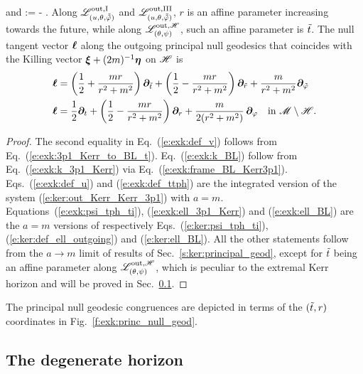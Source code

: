 \begin{greybox}
\begin{itemize}
\ee
and
\be \label{e:exk:psi_tph_ti}
    \psi := \tph -  .
\ee
Along $\mathscr{L}^{\rm out, I}_{(u,\theta,\tilde{{\tilde\varphi}})}$ and $\mathscr{L}^{\rm out, III}_{(u,\theta,\tilde{{\tilde\varphi}})}$,
$r$ is an affine parameter increasing towards the future,
while along $\mathscr{L}^{{\rm out},\mathscr{H}}_{(\theta,\psi)}$, such an affine parameter is ${\tilde t}$. The null tangent vector $\bm{\ell}$ along the outgoing principal null geodesics
that coincides with the Killing vector $\bm{\xi} + (2m)^{-1} \bm{\eta}$ on $\mathscr{H}$ is
\begin{subequations}
\begin{align}
 \bm{\ell} & = \left( \frac{1}{2}  + \frac{m r}{r^2 + m^2}\right) \bm{\partial}_{{\tilde t}}
  +  \left( \frac{1}{2} - \frac{m r}{r^2 + m^2}\right) \bm{\partial}_{\tilde{r}}
  + \frac{m}{r^2 + m^2} \bm{\partial}_{{\tilde\varphi}} \label{e:exk:ell_3p1_Kerr}\\
 \bm{\ell} & =  \frac{1}{2} \bm{\partial}_t
            + \left( \frac{1}{2}  - \frac{m r}{r^2 + m^2} \right) \bm{\partial}_r
            + \frac{m}{2(r^2 + m^2)} \, \bm{\partial}_\varphi
            \quad \mbox{in}\ \mathscr{M}\setminus\mathscr{H} . \label{e:exk:ell_BL}
\end{align}
\end{subequations}
\end{itemize}
\end{greybox}
\begin{proof}
The second equality in Eq.~(\ref{e:exk:def_v}) follows from Eq.~(\ref{e:exk:3p1_Kerr_to_BL_t}).
Eq.~(\ref{e:exk:k_BL}) follow from Eq.~(\ref{e:exk:k_3p1_Kerr}) via Eq.~(\ref{e:exk:frame_BL_Kerr3p1}).
Eqs.~(\ref{e:exk:def_u}) and (\ref{e:exk:def_ttph}) are the integrated version of the system (\ref{e:ker:out_Kerr_Kerr_3p1}) with $a=m$. Equations~(\ref{e:exk:psi_tph_ti}), (\ref{e:exk:ell_3p1_Kerr})
and (\ref{e:exk:ell_BL}) are the $a=m$ versions of respectively
Eqs.~(\ref{e:ker:psi_tph_ti}), (\ref{e:ker:def_ell_outgoing}) and (\ref{e:ker:ell_BL}).
All the other statements follow from the $a\to m$ limit of results of Sec.~\ref{s:ker:principal_geod},
except for ${\tilde t}$ being an affine parameter along $\mathscr{L}^{{\rm out},\mathscr{H}}_{(\theta,\psi)}$, which
is peculiar to the extremal Kerr horizon and will
be proved in Sec.~\ref{s:exk:horizon}.
\end{proof}

The principal null geodesic congruences are depicted in terms of the $({\tilde t}, r)$
coordinates in Fig.~\ref{f:exk:princ_null_geod}.


\subsection{The degenerate horizon} \label{s:exk:horizon}

